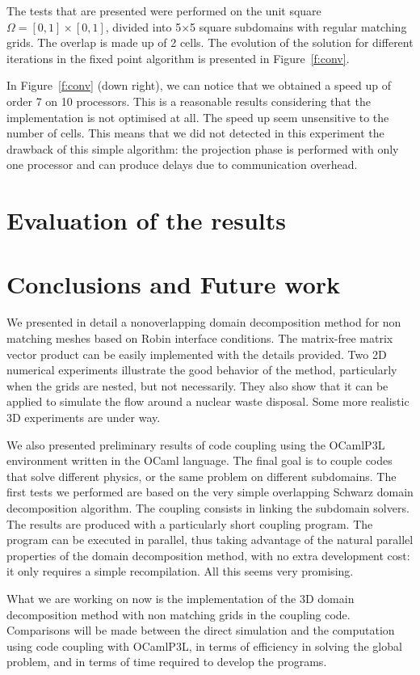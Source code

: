 The tests that are presented were performed on the unit square
$\Omega=[0,1]\times[0,1]$, divided into 5$\times$5 square subdomains with
regular matching grids. The overlap is made up of 2 cells. The evolution of the
solution for different iterations in the fixed point algorithm is presented in
Figure~\ref{f:conv}.

In Figure~\ref{f:conv} (down right), we can notice that we obtained a
speed up of order 7 on 10 processors. This is a reasonable results
considering that the implementation is not optimised at all. The speed
up seem unsensitive to the number of cells. This means that we did not
detected in this experiment the drawback of this simple algorithm: the
projection phase is performed with only one processor and can produce
delays due to communication overhead.

\section{Evaluation of the results}
%


\section{Conclusions and Future work}
%

We presented in detail a nonoverlapping domain decomposition method for non
matching meshes based on Robin interface conditions. The matrix-free matrix
vector product can be easily implemented with the details provided. 
Two 2D numerical experiments illustrate the good
behavior of the method, particularly when the grids are nested, but not
necessarily. They also show that it can be applied to simulate the flow around
a nuclear waste disposal. Some more realistic 3D experiments are under way.

We also presented preliminary results of code coupling using the OCamlP3L
environment written in the OCaml language. The final goal is to couple codes
that solve different physics, or the same problem on different subdomains. The
first tests we performed are based on the very simple overlapping Schwarz
domain decomposition algorithm. The coupling consists in linking the subdomain
solvers. The results are produced with a particularly short coupling program.
The program can be executed in parallel, thus taking advantage of the natural
parallel properties of the domain decomposition method, with no extra
development cost: it only requires a simple recompilation. All this seems very
promising.

What we are working on now is the implementation of the 3D domain decomposition
method with non matching grids in the coupling code. Comparisons will be made
between the direct simulation and the computation using code coupling with
OCamlP3L, in terms of efficiency in solving the global problem, and in terms of
time required to develop the programs.
